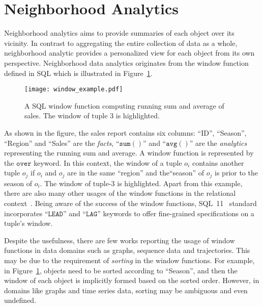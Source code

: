 \section{Neighborhood Analytics}
Neighborhood analytics aims to provide
summaries of each object over its vicinity. In contrast to aggregating the entire collection of data as a whole, neighborhood
analytic provides a personalized view for each object from its own perspective. Neighborhood
data analytics originates from the window function defined in SQL which is
illustrated in Figure~\ref{fig:window}.

\begin{figure}[h]
\centering
\texttt{[image: window\_example.pdf]}
\caption{A SQL window function computing running sum and average of
sales. The window of tuple 3 is highlighted.} 
\label{fig:window}
\end{figure}

As shown in the figure, the sales report contains six columns: ``ID'',
``Season'', ``Region'' and ``Sales'' are the \emph{facts}, ``$\mathtt{sum()}$'' and ``$\mathtt{avg()}$''
are the \emph{analytics} representing the running sum and average. A window function
is represented by the $\mathtt{over}$ keyword. In this context, the window of a tuple $o_i$
contains another tuple $o_j$ if $o_i$ and $o_j$ are in the same ``region'' and the``season'' of $o_j$ is
prior to the season of $o_i$. The window of tuple-$3$ is highlighted.
Apart from this example, there are also many other 
usages of the window functions in the relational context~\cite{cao2012optimization}. 
Being aware of the success of the window functions, 
SQL~11~\cite{zemke2012s} standard incorporates ``$\mathtt{LEAD}$'' and ``$\mathtt{LAG}$'' 
keywords to offer fine-grained specifications on a tuple's window.

Despite the usefulness, there are few works reporting
the usage of window functions in data domains such as graphs, sequence data and trajectories.
This may be due to the
requirement of \emph{sorting} in the window functions. For example,
in Figure~\ref{fig:window},
objects need to be sorted according to ``Season'', and then the window of
each object is implicitly formed based on the sorted order. However, 
in domains like graphs and time series data, sorting may be ambiguous and even undefined.

